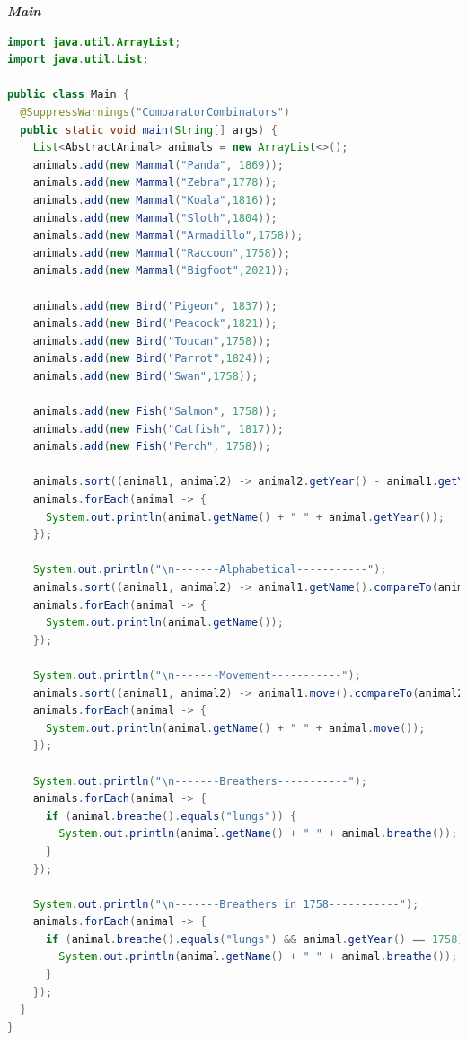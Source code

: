 \documentclass[11pt, twocolumn]{article}
\begin{document}
  \textbf{\textit{Main}}
  \begin{lstlisting}[language=Java]
import java.util.ArrayList;
import java.util.List;

public class Main {
  @SuppressWarnings("ComparatorCombinators")
  public static void main(String[] args) {
    List<AbstractAnimal> animals = new ArrayList<>();
    animals.add(new Mammal("Panda", 1869));
    animals.add(new Mammal("Zebra",1778));
    animals.add(new Mammal("Koala",1816));
    animals.add(new Mammal("Sloth",1804));
    animals.add(new Mammal("Armadillo",1758));
    animals.add(new Mammal("Raccoon",1758));
    animals.add(new Mammal("Bigfoot",2021));

    animals.add(new Bird("Pigeon", 1837));
    animals.add(new Bird("Peacock",1821));
    animals.add(new Bird("Toucan",1758));
    animals.add(new Bird("Parrot",1824));
    animals.add(new Bird("Swan",1758));

    animals.add(new Fish("Salmon", 1758));
    animals.add(new Fish("Catfish", 1817));
    animals.add(new Fish("Perch", 1758));

    animals.sort((animal1, animal2) -> animal2.getYear() - animal1.getYear());
    animals.forEach(animal -> {
      System.out.println(animal.getName() + " " + animal.getYear());
    });

    System.out.println("\n-------Alphabetical-----------");
    animals.sort((animal1, animal2) -> animal1.getName().compareTo(animal2.getName()));
    animals.forEach(animal -> {
      System.out.println(animal.getName());
    });

    System.out.println("\n-------Movement-----------");
    animals.sort((animal1, animal2) -> animal1.move().compareTo(animal2.move()));
    animals.forEach(animal -> {
      System.out.println(animal.getName() + " " + animal.move());
    });

    System.out.println("\n-------Breathers-----------");
    animals.forEach(animal -> {
      if (animal.breathe().equals("lungs")) {
        System.out.println(animal.getName() + " " + animal.breathe());
      }
    });

    System.out.println("\n-------Breathers in 1758-----------");
    animals.forEach(animal -> {
      if (animal.breathe().equals("lungs") && animal.getYear() == 1758) {
        System.out.println(animal.getName() + " " + animal.breathe());
      }
    });
  }
}
  \end{lstlisting}
  
\end{document}
